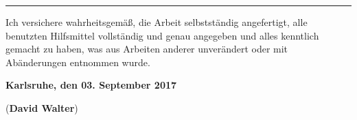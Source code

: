 \vspace*{\fill}


\textcolor{grund}{\rule{1.0\textwidth}{0.6pt}}

\vspace*{0.75em}

Ich versichere wahrheitsgem\"a\ss, die Arbeit selbstst\"andig angefertigt, alle benutzten Hilfsmittel vollst\"andig und genau angegeben und alles kenntlich ge\-macht zu haben, was aus Arbeiten anderer unver\"andert oder mit Ab\"anderungen entnommen wurde.

\vspace*{0.75em}

\textbf{Karlsruhe, den 03. September 2017}

\vspace*{4em}

\dotfill \hspace*{8cm} 

\hspace*{1.79cm}(\textbf{David Walter})